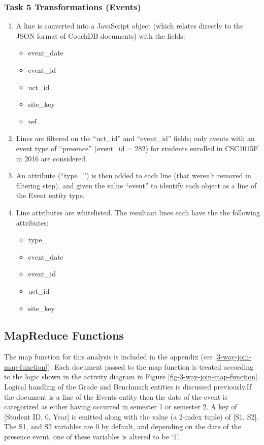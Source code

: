 \subsubsection{Task 5 Transformations (Events)}
\begin{enumerate}
  \item A line is converted into a JavaScript object (which relates directly to the JSON format of CouchDB documents) with the fields:
        \begin{itemize}
          \item event\_date
          \item event\_id
          \item uct\_id
          \item site\_key
          \item ref
        \end{itemize}
  \item Lines are filtered on the ``uct\_id'' and ``event\_id'' fields; only events with an event type of ``presence'' (event\_id = 282) for students enrolled in CSC1015F in 2016 are considered.
  \item An attribute (``type\_'') is then added to each line (that weren't removed in filtering step), and given the value ``event'' to identify each object as a line of the Event entity type.
  \item Line attributes are whitelisted. The resultant lines each have the the following attributes:
        \begin{itemize}
          \item type\_
          \item event\_date
          \item event\_id
          \item uct\_id
          \item site\_key
        \end{itemize}
\end{enumerate}

\subsection{MapReduce Functions}
The map function for this analysis is included in the appendix (see \ref{3-way-join-map-function}). Each document passed to the map function is treated according to the logic shown in the activity diagram in Figure \ref{fig-3-way-join-map-function}. Logical handling of the Grade and Benchmark entities is discussed previously.If the document is a line of the Events entity then the date of the event is categorized as either having occurred in semester 1 or semester 2. A key of [Student ID, 0, Year] is emitted along with the value (a 2-index tuple) of [S1, S2]. The S1, and S2 variables are 0 by default, and depending on the date of the presence event, one of these variables is altered to be `1'.

